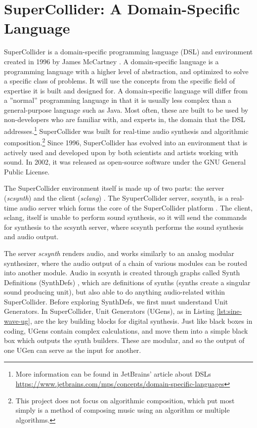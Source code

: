 \section[SuperCollider: A Domain-Specific Language]{SuperCollider: A Domain-Specific Language}\label{chapter:supercollider}

SuperCollider is a domain-specific programming language (DSL) and environment created in 1996 by James McCartney \cite{McCartney_2002}. A domain-specific language is a programming language with a higher level of abstraction, and optimized to solve a specific class of problems. It will use the concepts from the specific field of expertise it is built and designed for. A domain-specific language will differ from a ''normal'' programming language in that it is usually less complex than a general-purpose language such as Java. Most often, these are built to be used by non-developers who are familiar with, and experts in, the domain that the DSL addresses.\footnote{More information can be found in JetBrains' article about DSLs  \url{https://www.jetbrains.com/mps/concepts/domain-specific-languages}} SuperCollider was built for real-time audio synthesis and algorithmic composition.\footnote{This project does not focus on algorithmic composition, which put most simply is a method of composing music using an algorithm or multiple algorithms.} Since 1996, SuperCollider has evolved into an environment that is actively used and developed upon by both scientists and artists working with sound. In 2002, it was released as open-source software under the GNU General Public License.

The SuperCollider environment itself is made up of two parts: the server (\textit{scsynth}) and the client (\textit{sclang}) \cite{McCartney_2002}. The SyuperCollider server, scsynth, is a real-time audio server which forms the core of the SuperCollider platform \cite{McCartney_2021}. The client, sclang, itself is unable to perform sound synthesis, so it will send the commands for synthesis to the scsynth server, where scsynth performs the sound synthesis and audio output.

The server \textit{scsynth} renders audio, and works similarly to an analog modular synthesizer, where the audio output of a chain of various modules can be routed into another module. Audio in scsynth is created through graphs called Synth Definitions (SynthDefs) \cite{McCartney_2002}, which are definitions of synths (synths create a singular sound producing unit), but also able to do anything audio-related within SuperCollider. Before exploring SynthDefs, we first must understand Unit Generators. In SuperCollider, Unit Generators (UGens), as in Listing \ref{lst:sine-wave-ug}, are the key building blocks for digital synthesis. Just like black boxes in coding, UGens contain complex calculations, and move them into a simple black box which outputs the synth builders. These are modular, and so the output of one UGen can serve as the input for another. 

